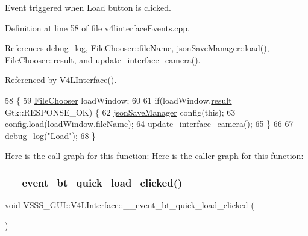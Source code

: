 Event triggered when \textquotesingle{}Load\textquotesingle{} button is clicked. 



Definition at line 58 of file v4linterface\+Events.\+cpp.



References debug\+\_\+log, File\+Chooser\+::file\+Name, json\+Save\+Manager\+::load(), File\+Chooser\+::result, and update\+\_\+interface\+\_\+camera().



Referenced by V4\+L\+Interface().


\begin{DoxyCode}
58                                                \{
59         \hyperlink{class_file_chooser}{FileChooser} loadWindow;
60 
61         \textcolor{keywordflow}{if}(loadWindow.\hyperlink{class_file_chooser_a7651bd1362ed109c0ac323d8ab41b254}{result} == Gtk::RESPONSE\_OK) \{
62             \hyperlink{classjson_save_manager}{jsonSaveManager} config(\textcolor{keyword}{this});
63             config.load(loadWindow.\hyperlink{class_file_chooser_a1d086cbbd2700e5fe9e143c505b205c8}{fileName});
64             \hyperlink{class_v_s_s_s___g_u_i_1_1_v4_l_interface_a13ef172ecb7af3eb140f686b02a80662}{update\_interface\_camera}();
65         \}
66 
67         \hyperlink{debug_8hpp_afde3f42696113719c9ae35507125ee6e}{debug\_log}(\textcolor{stringliteral}{"Load"});
68     \}
\end{DoxyCode}
Here is the call graph for this function\+:
Here is the caller graph for this function\+:
\mbox{\label{class_v_s_s_s___g_u_i_1_1_v4_l_interface_a3010084dff2d7f93eed40efaab8ee61b}} 
\subsubsection{\texorpdfstring{\+\_\+\+\_\+event\+\_\+bt\+\_\+quick\+\_\+load\+\_\+clicked()}{\_\_event\_bt\_quick\_load\_clicked()}}
{\footnotesize\ttfamily void V\+S\+S\+S\+\_\+\+G\+U\+I\+::\+V4\+L\+Interface\+::\+\_\+\+\_\+event\+\_\+bt\+\_\+quick\+\_\+load\+\_\+clicked (\begin{DoxyParamCaption}{ }\end{DoxyParamCaption})}



